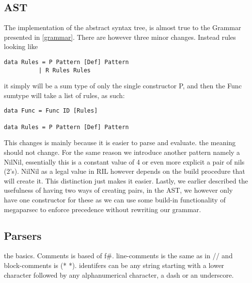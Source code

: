 \documentclass[a4paper]{article}
\begin{document}
\subsection{AST}
\label{sec:org12363e7}
The implementation of the abstract syntax tree, is almost true to the Grammar presented in \ref{grammar}. There are however three minor changes. Instead rules looking like
\begin{verbatim}
data Rules = P Pattern [Def] Pattern
          | R Rules Rules
\end{verbatim}
it simply will be a sum type of only the single constructor P, and then the Func sumtype will take a list of rules, as such:
\begin{verbatim}
data Func = Func ID [Rules]

data Rules = P Pattern [Def] Pattern
\end{verbatim}
This changes is mainly because it is easier to parse and evaluate. the meaning should not change.
For the same reason we introduce another pattern namely a NilNil, essentially this is a constant value of 4 or even more explicit a pair of nils (2's). NilNil as a legal value in RIL however depends on the build procedure that will create it. This distinction just makes it easier.
Lastly, we earlier described the usefulness of having two ways of creating pairs, in the AST, we however only have one constructor for these as we can use some build-in functionality of megaparsec to enforce precedence without rewriting our grammar.

\subsection{Parsers}
\label{sec:org974220a}
the basics.
Comments is based of f\#. line-comments is the same as in // and block-comments is (* *). identifers can be any string starting with a lower character followed by any alphanumerical character, a dash or an underscore.
\end{document}
